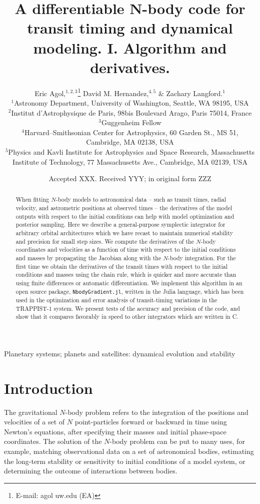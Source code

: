 \documentclass[fleqn,usenatbib,twocolumn]{mnras}
\title[Derivatives of TTVs]{A differentiable N-body code for transit timing and dynamical modeling. I. Algorithm and derivatives.}
\author[E. Agol et al.]{
Eric Agol,$^{1,2,3}$\thanks{E-mail: agol uw.edu (EA)}
David M. Hernandez,$^{4,5}$
\& Zachary Langford.$^{1}$
\\
$^{1}${Astronomy Department, University of Washington, Seattle, WA 98195, USA}\\
$^{2}${Institut d'Astrophysique de Paris, 98bis Boulevard Arago, Paris 75014, France}\\
$^{3}${Guggenheim Fellow} \\
$^{4}${Harvard--Smithsonian Center for Astrophysics, 60 Garden St., MS 51, Cambridge, MA 02138, USA} \\
$^{5}${Physics and Kavli Institute for Astrophysics and Space Research, Massachusetts Institute of Technology,  77 Massachusetts Ave., Cambridge, MA 02139, USA}
}
\date{Accepted XXX. Received YYY; in original form ZZZ}
\newcommand   {\change}[1] {{\color{black}{#1}}}
\begin{document}
\label{firstpage}
\pagerange{\pageref{firstpage}--\pageref{lastpage}}

\maketitle

\begin{abstract}
When fitting $N$-body models to astronomical data -- such as transit times, radial velocity, and astrometric positions at
observed times -- the derivatives of the model
outputs with respect to the initial conditions can help with model optimization and posterior sampling.  Here we describe a general-purpose symplectic integrator for
arbitrary orbital architectures\change{, including those with close encounters,} which we have recast to maintain numerical stability
and precision for small step sizes. We compute the derivatives of the $N$-body
coordinates and velocities as a function of time with respect to the initial conditions
and masses by propagating the Jacobian along with the $N$-body integration.   For the
first time we obtain the derivatives of the transit times with respect to the initial
conditions and masses using the chain rule, which is quicker and more accurate than using finite differences or automatic differentiation.   We implement this algorithm in an open source package, \texttt{NbodyGradient.jl}, written in the Julia language,  which has been used in the optimization and error analysis of
transit-timing variations in the TRAPPIST-1 system.
We present tests of the
accuracy and precision of the code, and show that it compares favorably in speed to other
integrators which are written in C.
\end{abstract}

\begin{keywords}
Planetary systems; planets and satellites: dynamical evolution and stability
\end{keywords}




\section{Introduction}
The gravitational $N$-body problem refers to the integration of the positions
and velocities of a set of $N$ point-particles forward or backward in time using Newton's
equations, after specifying their masses and initial phase-space coordinates.
The solution of the $N$-body problem can be put to many uses, for example,
matching observational data on a set of astronomical bodies,  estimating the
long-term stability or sensitivity to initial conditions of a model system, or
determining the outcome of interactions between bodies.
\end{document}
